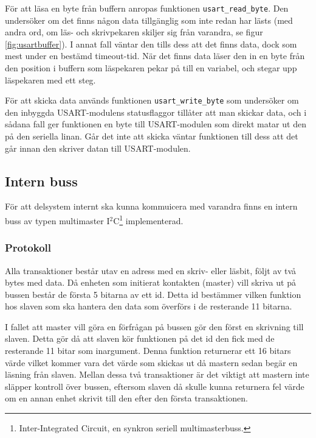 
För att läsa en byte från buffern anropas funktionen \verb|usart_read_byte|. Den undersöker om det finns någon data tillgänglig som inte redan har lästs (med andra ord, om läs- och skrivpekaren skiljer sig från varandra, se figur \ref{fig:usartbuffer}). I annat fall väntar den tills dess att det finns data, dock som mest under en bestämd timeout-tid. När det finns data läser den in en byte från den position i buffern som läspekaren pekar på till en variabel, och stegar upp läspekaren med ett steg.

För att skicka data används funktionen \verb|usart_write_byte| som undersöker om den inbyggda USART-modulens statusflaggor tillåter att man skickar data, och i sådana fall ger funktionen en byte till USART-modulen som direkt matar ut den på den seriella linan. Går det inte att skicka väntar funktionen till dess att det går innan den skriver datan till USART-modulen.

\subsection{Intern buss}
\label{sec:bus}

För att delsystem internt ska kunna kommuicera med varandra finns en intern buss av typen multimaster I$^2$C\footnote{Inter-Integrated Circuit, en synkron seriell multimasterbuss.} implementerad.

\subsubsection{Protokoll}
\label{sec:bus-protokoll}
Alla transaktioner består utav en adress med en skriv- eller läsbit, följt av två bytes med data. Då enheten som initierat kontakten (master) vill skriva ut på bussen består de första 5 bitarna av ett id. Detta id bestämmer vilken funktion hos slaven som ska hantera den data som överförs i de resterande 11 bitarna.


I fallet att master vill göra en förfrågan på bussen gör den först en skrivning till slaven. Detta gör då att slaven kör funktionen på det id den fick med de resterande 11 bitar som inargument. Denna funktion returnerar ett 16 bitars värde vilket kommer vara det värde som skickas ut då mastern sedan begär en läsning från slaven. Mellan dessa två transaktioner är det viktigt att mastern inte släpper kontroll över bussen, eftersom slaven då skulle kunna returnera fel värde om en annan enhet skrivit till den efter den första transaktionen.

